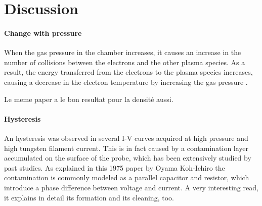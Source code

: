 \section{Discussion}

\paragraph{Change with pressure}
When the gas pressure in the chamber increases, it causes an increase in the number of collisions between the electrons and the other plasma species. 
As a result, the energy transferred from the electrons to the plasma species increases, causing a decrease in the electron temperature by increasing the gas pressure \cite{hassouba_analysis_2013}.

Le meme paper a le bon resultat pour la densité aussi.

\paragraph{Hysteresis}
An hysteresis was observed in several I-V curves acquired at high pressure and high tungsten filament current.
This is in fact caused by a contamination layer accumulated on the surface of the probe, which has been extensively studied by past studies.
As explained in this 1975 paper by Oyama Koh-Ichiro the contamination is commonly modeled as a parallel capacitor and resistor, which introduce a phase difference between voltage and current.
A very interesting read, it explains in detail its formation and its cleaning, too.
